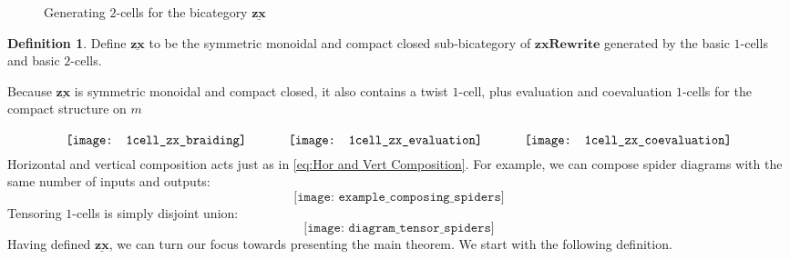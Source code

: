 \documentclass[11pt]{amsart}
\theoremstyle{definition}
\newtheorem{defn}[thm]{Definition}
\begin{document}
\begin{figure}[h]
	\caption{Generating $2$-cells for the bicategory $\underline{\mathbf{zx}}$}
	\label{fig:ZX 2cells generators}
\end{figure}

\begin{defn}
	\label{def:zx bicat}
	Define $\underline{\mathbf{zx}}$ to be the symmetric monoidal and compact closed sub-bicategory of $\mathbf{zxRewrite}$ generated by the basic $1$-cells and basic $2$-cells.
\end{defn}

Because $\underline{\mathbf{zx}}$ is symmetric monoidal and compact closed, it also contains a twist $1$-cell, plus evaluation and coevaluation $1$-cells for the compact structure on $m$ 
\begin{equation}
\label{diag:TwistCompact 1cells}
\raisebox{-0.8\height}{
	\texttt{[image: 1cell\_zx\_braiding]}
	\quad \quad \quad
	\texttt{[image: 1cell\_zx\_evaluation]}
	\quad \quad \quad
	\texttt{[image: 1cell\_zx\_coevaluation]}
}
\end{equation}
Horizontal and vertical composition acts just as in \eqref{eq:Hor and Vert Composition}. For example, we can compose spider diagrams with the same number of inputs and outputs:
\[
	\texttt{[image: example\_composing\_spiders]}
\]
Tensoring $1$-cells is simply disjoint union: 
\[
	\texttt{[image: diagram\_tensor\_spiders]}
\]
Having defined $\underline{\mathbf{zx}}$, we can turn our focus towards presenting the main theorem. We start with the following definition.
\end{document}
